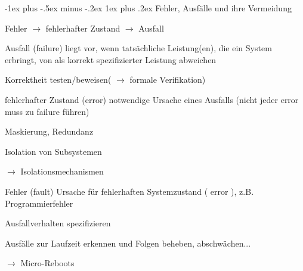 \documentclass[a4paper]{article}
\makeatletter
\renewcommand{\subsubsection}{\@startsection{subsubsection}{3}{0mm}%
 {-1ex plus -.5ex minus -.2ex}%
 {1ex plus .2ex}%
 {\normalfont\small\bfseries}}
\makeatother
\begin{document}
\begin{multicols}{3}
    \subsubsection{Fehler, Ausfälle und ihre Vermeidung}
    \begin{itemize*}
        \item Fehler $\rightarrow$ fehlerhafter Zustand $\rightarrow$ Ausfall
    \end{itemize*}
    \begin{description*}
        \item[Ausfall] (failure) liegt vor, wenn tatsächliche Leistung(en), die ein System erbringt, von als korrekt spezifizierter Leistung abweichen
        \begin{itemize*}
            \item Korrektheit testen/beweisen( $\rightarrow$ formale Verifikation)
        \end{itemize*}
        \item[fehlerhafter Zustand] (error) notwendige Ursache eines Ausfalls (nicht jeder error muss zu failure führen)
        \begin{itemize*}
            \item Maskierung, Redundanz
            \item Isolation von Subsystemen
            \item[$\rightarrow$] Isolationsmechanismen
        \end{itemize*}
        \item[Fehler] (fault) Ursache für fehlerhaften Systemzustand ( error ), z.B. Programmierfehler
        \begin{itemize*}
            \item Ausfallverhalten spezifizieren
            \item Ausfälle zur Laufzeit erkennen und Folgen beheben, abschwächen...
            \item[$\rightarrow$] Micro-Reboots
        \end{itemize*}
    \end{description*}


\end{multicols}
\end{document}
